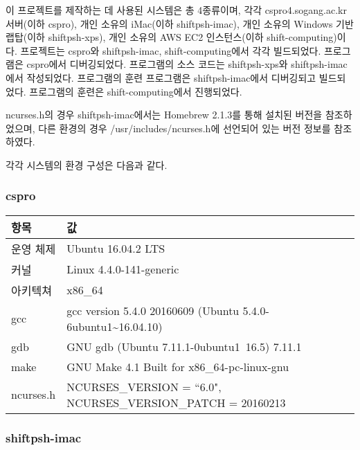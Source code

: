 이 프로젝트를 제작하는 데 사용된 시스템은 총 4종류이며, 각각 cspro4.sogang.ac.kr 서버(이하 cspro), 개인 소유의 iMac(이하 shiftpsh-imac),
개인 소유의 Windows 기반 랩탑(이하 shiftpsh-xps), 개인 소유의 AWS EC2 인스턴스(이하 shift-computing)이다.
프로젝트는 cspro와 shiftpsh-imac, shift-computing에서 각각 빌드되었다. 프로그램은 cspro에서 디버깅되었다. 프로그램의 소스 코드는 shiftpsh-xps와 shiftpsh-imac에서 작성되었다.
프로그램의 훈련 프로그램은 shiftpsh-imac에서 디버깅되고 빌드되었다. 프로그램의 훈련은 shift-computing에서 진행되었다.

ncurses.h의 경우 shiftpsh-imac에서는 Homebrew 2.1.3를 통해 설치된 버전을 참조하었으며, 다른 환경의 경우 /usr/includes/ncurses.h에 선언되어 있는 버전 정보를 참조하였다.

각각 시스템의 환경 구성은 다음과 같다.

\subsubsection{cspro}\hfill

\begin{tabularx}{\linewidth}{l|X}
    항목 & 값 \\
    \hline
    운영 체제 & Ubuntu 16.04.2 LTS \\
    커널 & Linux 4.4.0-141-generic \\
    아키텍쳐 & x86_64 \\
    \hline
    gcc & gcc version 5.4.0 20160609 (Ubuntu 5.4.0-6ubuntu1\textasciitilde{}16.04.10) \\
    gdb & GNU gdb (Ubuntu 7.11.1-0ubuntu1~16.5) 7.11.1 \\
    make & GNU Make 4.1 Built for x86_64-pc-linux-gnu \\
    \hline
    ncurses.h & NCURSES_VERSION = ``6.0", NCURSES_VERSION_PATCH = 20160213 \\
\end{tabularx}

\subsubsection{shiftpsh-imac}\hfill

